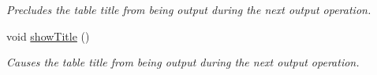 \begin{DoxyCompactItemize}
\begin{DoxyCompactList}\small\item\em Precludes the table title from being output during the next output operation. \end{DoxyCompactList}\item 
void \hyperlink{structslb_1_1core_1_1util_1_1Table_af87b68a02a87b642ea00186f0881d465}{show\+Title} ()\hypertarget{structslb_1_1core_1_1util_1_1Table_af87b68a02a87b642ea00186f0881d465}{}\label{structslb_1_1core_1_1util_1_1Table_af87b68a02a87b642ea00186f0881d465}

\begin{DoxyCompactList}\small\item\em Causes the table title from being output during the next output operation. \end{DoxyCompactList}\end{DoxyCompactItemize}
